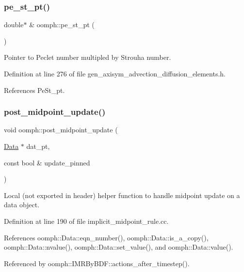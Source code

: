\subsubsection{\texorpdfstring{pe\+\_\+st\+\_\+pt()}{pe\_st\_pt()}}
{\footnotesize\ttfamily double$\ast$ \& oomph\+::pe\+\_\+st\+\_\+pt (\begin{DoxyParamCaption}{ }\end{DoxyParamCaption})}



Pointer to Peclet number multipled by Strouha number. 



Definition at line 276 of file gen\+\_\+axisym\+\_\+advection\+\_\+diffusion\+\_\+elements.\+h.



References Pe\+St\+\_\+pt.

\mbox{\label{namespaceoomph_a94e38c3e339e7f204bfe1e49de1622f3}} 
\subsubsection{\texorpdfstring{post\+\_\+midpoint\+\_\+update()}{post\_midpoint\_update()}}
{\footnotesize\ttfamily void oomph\+::post\+\_\+midpoint\+\_\+update (\begin{DoxyParamCaption}\item[{\hyperlink{classoomph_1_1Data}{Data} $\ast$}]{dat\+\_\+pt,  }\item[{const bool \&}]{update\+\_\+pinned }\end{DoxyParamCaption})}

Local (not exported in header) helper function to handle midpoint update on a data object. 

Definition at line 190 of file implicit\+\_\+midpoint\+\_\+rule.\+cc.



References oomph\+::\+Data\+::eqn\+\_\+number(), oomph\+::\+Data\+::is\+\_\+a\+\_\+copy(), oomph\+::\+Data\+::nvalue(), oomph\+::\+Data\+::set\+\_\+value(), and oomph\+::\+Data\+::value().



Referenced by oomph\+::\+I\+M\+R\+By\+B\+D\+F\+::actions\+\_\+after\+\_\+timestep().

\mbox{\label{namespaceoomph_a6a5cfce839009bef49cce08492ec6aeb}} 
